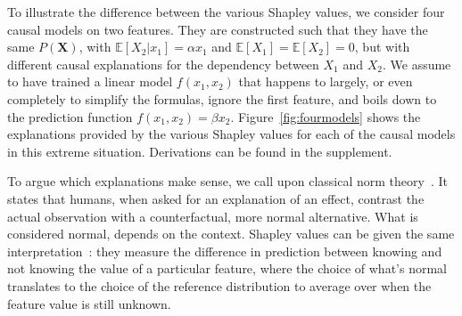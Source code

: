 \documentclass{article}
\newcommand{\vX}{\mathbf{X}}
\newcommand{\expectation}{\mathbb{E}}
\newcommand{\comment}[1]{{\color{red} #1}}
\begin{document}
To illustrate the difference between the various Shapley values, we consider four causal models on two features. They are constructed such that they have the same $P(\vX)$, with $\expectation[X_2|x_1] = \alpha x_1$ and $\expectation[X_1] = \expectation[X_2] = 0$, but with different causal explanations for the dependency between $X_1$ and $X_2$.
We assume to have trained a linear model $f(x_1,x_2)$ that happens to largely, or even completely to simplify the formulas, ignore the first feature, and boils down to the prediction function $f(x_1,x_2) = \beta x_2$. Figure~\ref{fig:fourmodels} shows the explanations provided by the various Shapley values for each of the causal models in this extreme situation. Derivations can be found in the supplement.

To argue which explanations make sense, we call upon classical norm theory~\cite{kahneman1986norm}. It states that humans, when asked for an explanation of an effect, contrast the actual observation with a counterfactual, more normal alternative. What is considered normal, depends on the context. Shapley values can be given the same interpretation~\cite{merrick2019explanation}: they measure the difference in prediction between knowing and not knowing the value of a particular feature, where the choice of what's normal translates to the choice of the reference distribution to average over when the feature value is still unknown.
\end{document}
